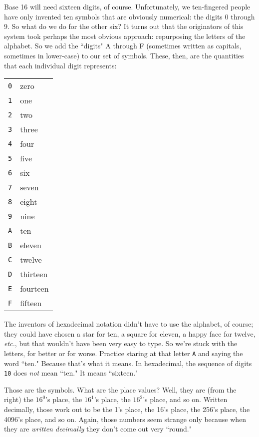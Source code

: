 Base 16 will need sixteen digits, of course. Unfortunately, we
ten-fingered people have only invented ten symbols that are obviously
numerical: the digits 0 through 9. So what do we do for the other six?
It turns out that the originators of this system took perhaps the most
obvious approach: repurposing the letters of the alphabet. So we add the
``digits" A through F (sometimes written as capitals, sometimes in
lower-case) to our set of symbols. These, then, are the quantities that
each individual digit represents:
\begin{center}
\begin{tabular}{c l}
\texttt{0} & zero \\
\texttt{1} & one \\
\texttt{2} & two \\
\texttt{3} & three \\
\texttt{4} & four \\
\texttt{5} & five \\
\texttt{6} & six \\
\texttt{7} & seven \\
\texttt{8} & eight \\
\texttt{9} & nine \\
\texttt{A} & ten \\
\texttt{B} & eleven \\
\texttt{C} & twelve \\
\texttt{D} & thirteen \\
\texttt{E} & fourteen \\
\texttt{F} & fifteen \\
\end{tabular}
\end{center}
The inventors of hexadecimal notation didn't have to use the alphabet, of
course; they could have chosen a star for ten, a square for eleven, a happy
face for twelve, \textit{etc.}, but that wouldn't have been very easy to
type. So we're stuck with the letters, for better or for worse. Practice
staring at that letter \texttt{A} and saying the word ``ten." Because
that's what it means. In hexadecimal, the sequence of digits \texttt{10}
does \textit{not} mean ``ten." It means ``sixteen."

Those are the symbols. What are the place values? Well, they are (from the
right) the $16^0$'s place, the $16^1$'s place, the $16^2$'s place, and so
on. Written decimally, those work out to be the 1's place, the 16's place,
the 256's place, the 4096's place, and so on. Again, those numbers seem
strange only because when they are \textit{written decimally} they don't
come out very ``round."

